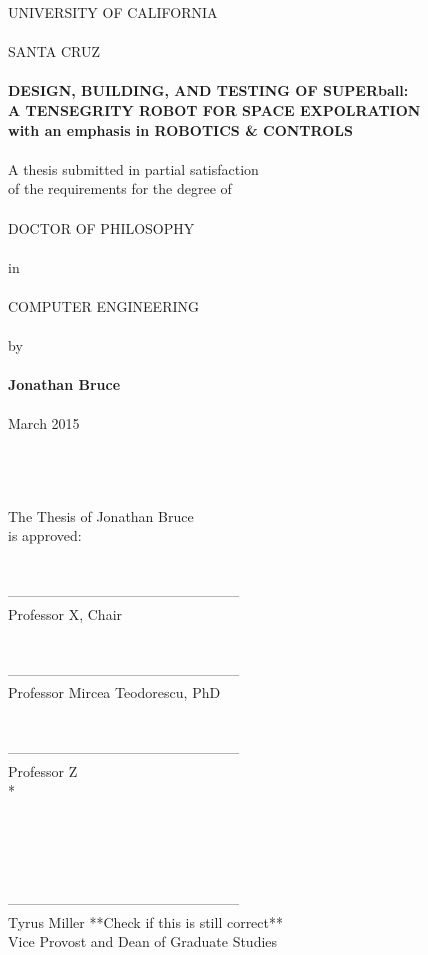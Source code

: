 \documentclass[11pt,oneside,a4paper,onecolumn]{article}                 %
\begin{document}


\thispagestyle{empty} %
\begin{center}
UNIVERSITY OF CALIFORNIA\\
\ \\
SANTA CRUZ\\
\ \\
{\bf DESIGN, BUILDING, AND TESTING OF SUPERball:\\ A TENSEGRITY ROBOT FOR SPACE EXPOLRATION}\\
{\bf with an emphasis in ROBOTICS \& CONTROLS}
\ \\
\ \\
A thesis submitted in partial satisfaction\\
of the requirements for the degree of\\
\ \\
DOCTOR OF PHILOSOPHY\\
\ \\
in\\
\ \\
COMPUTER ENGINEERING\\
\ \\
by\\
\ \\
{\bf Jonathan Bruce}\\
\ \\
March 2015\\
\ \\
\ \\
\ \\
\end{center}

{\addtolength{\leftskip}{76.2 mm} %
The Thesis of Jonathan Bruce\\
is approved:\\
\ \\
\ \\
--------------------------------------------------\\
Professor X, Chair\\
\ \\
\ \\
--------------------------------------------------\\
Professor Mircea Teodorescu, PhD\\
\ \\
\ \\
--------------------------------------------------\\
Professor Z\\*

}
\ \\
\ \\
\ \\
\ \\
--------------------------------------------------\\
Tyrus Miller **Check if this is still correct**\\
Vice Provost and Dean of Graduate Studies
\end{document}
